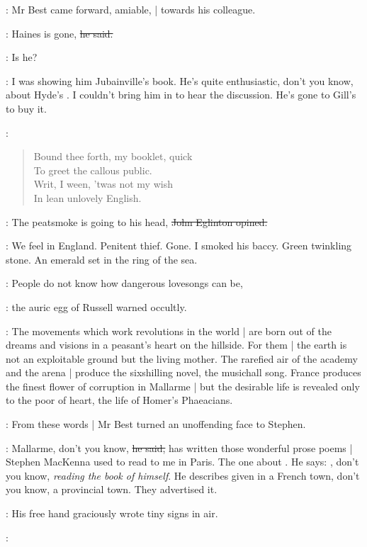 :
Mr Best came forward, amiable, |
towards his colleague.

\best:
Haines is gone,
\sout{he said.}

\eglinton:
Is he?

\best:
I was showing him Jubainville's book.
He's quite enthusiastic,
don't you know,
about Hyde's .
I couldn't bring him in to hear the discussion.
He's gone to Gill's to buy it.

\StephenInt:
\begin{verse}
    Bound thee forth, my booklet, quick \\
    To greet the callous public. \\
    Writ, I ween, 'twas not my wish \\
    In lean unlovely English.
\end{verse}

\eglinton:
The peatsmoke is going to his head,
\sout{John Eglinton opined.}

\StephenInt:
We feel in England.
Penitent thief.
Gone.
I smoked his baccy.
Green twinkling stone.
An emerald set in the ring of the sea.

\AErussell:
People do not know how dangerous lovesongs can be,

:
the auric egg of Russell warned occultly.

\AErussell:
The movements which work revolutions in the world |
are born out of the dreams and visions in a peasant's heart on the hillside.
For them |
the earth is not an exploitable ground but the living mother.
The rarefied air of the academy and the arena |
produce the sixshilling novel,
the musichall song.
France produces the finest flower of corruption in Mallarme |
but the desirable life is revealed only to the poor of heart,
the life of Homer's Phaeacians.

:
From these words |
Mr Best turned an unoffending face to Stephen.

\best:
Mallarme,
don't you know,
\sout{he said,}
has written those wonderful prose poems |
Stephen MacKenna used to read to me in Paris.
The one about .
He says:
,
don't you know,
\emph{reading the book of himself}.
He describes  given in a French town,
don't you know,
a provincial town.
They advertised it.

:
His free hand graciously wrote tiny signs in air.

\best:
\begin{verse}
\end{verse}

